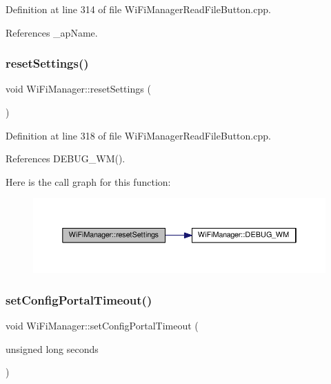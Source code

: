 Definition at line 314 of file Wi\+Fi\+Manager\+Read\+File\+Button.\+cpp.



References \+\_\+ap\+Name.

\mbox{\label{class_wi_fi_manager_a0027749816b6c66bc845d7c5db760a33}} 
\subsubsection{\texorpdfstring{reset\+Settings()}{resetSettings()}}
{\footnotesize\ttfamily void Wi\+Fi\+Manager\+::reset\+Settings (\begin{DoxyParamCaption}{ }\end{DoxyParamCaption})}



Definition at line 318 of file Wi\+Fi\+Manager\+Read\+File\+Button.\+cpp.



References D\+E\+B\+U\+G\+\_\+\+W\+M().

Here is the call graph for this function\+:\nopagebreak
\begin{figure}[H]
\begin{center}
\leavevmode
\includegraphics[width=350pt]{d4/dc8/class_wi_fi_manager_a0027749816b6c66bc845d7c5db760a33_cgraph}
\end{center}
\end{figure}
\mbox{\label{class_wi_fi_manager_a904006cb4d2c769e93bfdef336853766}} 
\subsubsection{\texorpdfstring{set\+Config\+Portal\+Timeout()}{setConfigPortalTimeout()}}
{\footnotesize\ttfamily void Wi\+Fi\+Manager\+::set\+Config\+Portal\+Timeout (\begin{DoxyParamCaption}\item[{unsigned long}]{seconds }\end{DoxyParamCaption})}



